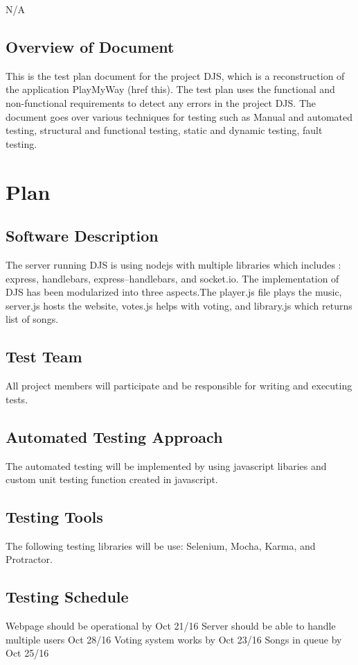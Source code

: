 \documentclass[12pt, titlepage]{article}
\begin{document}
N/A

\subsection{Overview of Document}
	This is the test plan document for the project DJS, which is a reconstruction of the application PlayMyWay (href this).
The test plan uses the functional and non-functional requirements to detect any errors in the project DJS.
The document goes over various techniques for testing such as Manual and automated testing, structural and
functional testing, static and dynamic testing, fault testing.

\section{Plan}
	
\subsection{Software Description}
The server running DJS is using nodejs with multiple libraries which includes : express, handlebars, express--handlebars, and socket.io. The implementation of DJS has been modularized into three aspects.The player.js file plays the music, server.js hosts the website, votes.js helps with voting, and library.js which returns list of songs. 

\subsection{Test Team}
All project members will participate and be responsible for writing and executing tests.

\subsection{Automated Testing Approach}
The automated testing will be implemented by using javascript libaries and custom unit testing function created in javascript.
\subsection{Testing Tools}
The following testing libraries will be use: Selenium, Mocha, Karma, and Protractor. 

\subsection{Testing Schedule}
Webpage should be operational by Oct 21/16
Server should be able to handle multiple users Oct 28/16
Voting system works by Oct 23/16
Songs in queue by Oct 25/16
\end{document}
